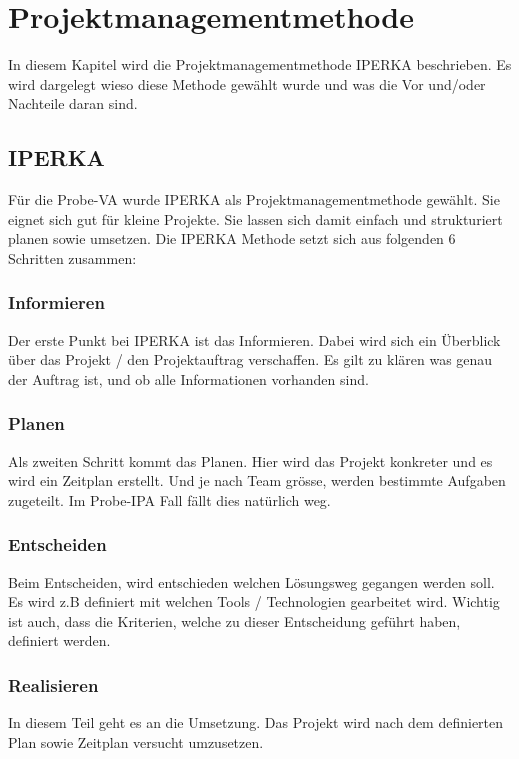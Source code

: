 
\chapter{Projektmanagementmethode}\label{ch:projektmanagementmethode}

In diesem Kapitel wird die Projektmanagementmethode IPERKA beschrieben. Es wird dargelegt wieso diese Methode gewählt wurde und was die Vor und/oder Nachteile daran sind.

\section{IPERKA}\label{sec:iperka}

Für die Probe-VA wurde IPERKA als Projektmanagementmethode gewählt. Sie eignet sich gut für kleine Projekte. Sie lassen sich damit einfach und strukturiert planen sowie umsetzen. 
Die IPERKA Methode setzt sich aus folgenden 6 Schritten zusammen:

\subsection{Informieren}
Der erste Punkt bei IPERKA ist das Informieren. Dabei wird sich ein Überblick über das Projekt / den Projektauftrag verschaffen. Es gilt zu klären was genau der Auftrag ist, und ob alle Informationen vorhanden sind.

\subsection{Planen}
Als zweiten Schritt kommt das Planen. Hier wird das Projekt konkreter und es wird ein Zeitplan erstellt. Und je nach Team grösse, werden bestimmte Aufgaben zugeteilt. Im Probe-IPA Fall fällt dies natürlich weg.

\subsection{Entscheiden}
Beim Entscheiden, wird entschieden welchen Lösungsweg gegangen werden soll. Es wird z.B definiert mit welchen Tools / Technologien gearbeitet wird. Wichtig ist auch, dass die Kriterien, welche zu dieser Entscheidung geführt haben, definiert werden.

\subsection{Realisieren}
In diesem Teil geht es an die Umsetzung. Das Projekt wird nach dem definierten Plan sowie Zeitplan versucht umzusetzen.

